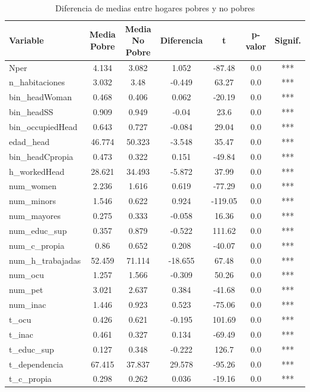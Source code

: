 \documentclass[12pt,a4paper,onecolumn]{article}
\begin{document}
\begin{table}[H]
\centering
\caption{Diferencia de medias entre hogares pobres y no pobres}
\small
\label{tab:dif_medias}
\begin{tabular}{lcccccc}
\toprule
Variable & Media Pobre & Media No Pobre & Diferencia & t & p-valor & Signif. \\
\midrule
Nper & 4.134 & 3.082 & 1.052 & -87.48 & 0.0 & *** \\
n\_habitaciones & 3.032 & 3.48 & -0.449 & 63.27 & 0.0 & *** \\
bin\_headWoman & 0.468 & 0.406 & 0.062 & -20.19 & 0.0 & *** \\
bin\_headSS & 0.909 & 0.949 & -0.04 & 23.6 & 0.0 & *** \\
bin\_occupiedHead & 0.643 & 0.727 & -0.084 & 29.04 & 0.0 & *** \\
edad\_head & 46.774 & 50.323 & -3.548 & 35.47 & 0.0 & *** \\
bin\_headCpropia & 0.473 & 0.322 & 0.151 & -49.84 & 0.0 & *** \\
h\_workedHead & 28.621 & 34.493 & -5.872 & 37.99 & 0.0 & *** \\
num\_women & 2.236 & 1.616 & 0.619 & -77.29 & 0.0 & *** \\
num\_minors & 1.546 & 0.622 & 0.924 & -119.05 & 0.0 & *** \\
num\_mayores & 0.275 & 0.333 & -0.058 & 16.36 & 0.0 & *** \\
num\_educ\_sup & 0.357 & 0.879 & -0.522 & 111.62 & 0.0 & *** \\
num\_c\_propia & 0.86 & 0.652 & 0.208 & -40.07 & 0.0 & *** \\
num\_h\_trabajadas & 52.459 & 71.114 & -18.655 & 67.48 & 0.0 & *** \\
num\_ocu & 1.257 & 1.566 & -0.309 & 50.26 & 0.0 & *** \\
num\_pet & 3.021 & 2.637 & 0.384 & -41.68 & 0.0 & *** \\
num\_inac & 1.446 & 0.923 & 0.523 & -75.06 & 0.0 & *** \\
t\_ocu & 0.426 & 0.621 & -0.195 & 101.69 & 0.0 & *** \\
t\_inac & 0.461 & 0.327 & 0.134 & -69.49 & 0.0 & *** \\
t\_educ\_sup & 0.127 & 0.348 & -0.222 & 126.7 & 0.0 & *** \\
t\_dependencia & 67.415 & 37.837 & 29.578 & -95.26 & 0.0 & *** \\
t\_c\_propia & 0.298 & 0.262 & 0.036 & -19.16 & 0.0 & *** \\
\bottomrule
\end{tabular}
\end{table}
\end{document}
